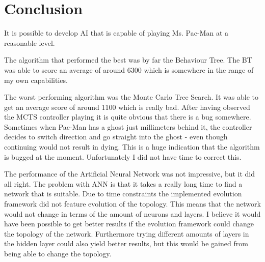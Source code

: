 
\section{Conclusion}
It is possible to develop AI that is capable of playing Ms. Pac-Man at a reasonable level.

The algorithm that performed the best was by far the Behaviour Tree. The BT was able to score an average of around 6300 which is somewhere in the range of my own capabilities.

The worst performing algorithm was the Monte Carlo Tree Search. It was able to get an average score of around 1100 which is really bad. After having observed the MCTS controller playing it is quite obvious that there is a bug somewhere. Sometimes when Pac-Man has a ghost just millimeters behind it, the controller decides to switch direction and go straight into the ghost - even though continuing would not result in dying. This is a huge indication that the algorithm is bugged at the moment. Unfortunately I did not have time to correct this.

The performance of the Artificial Neural Network was not impressive, but it did all right. The problem with ANN is that it takes a really long time to find a network that is suitable. Due to time constraints the implemented evolution framework did not feature evolution of the topology. This means that the network would not change in terms of the amount of neurons and layers. I believe it would have been possible to get better results if the evolution framework could change the topology of the network. Furthermore trying different amounts of layers in the hidden layer could also yield better results, but this would be gained from being able to change the topology.